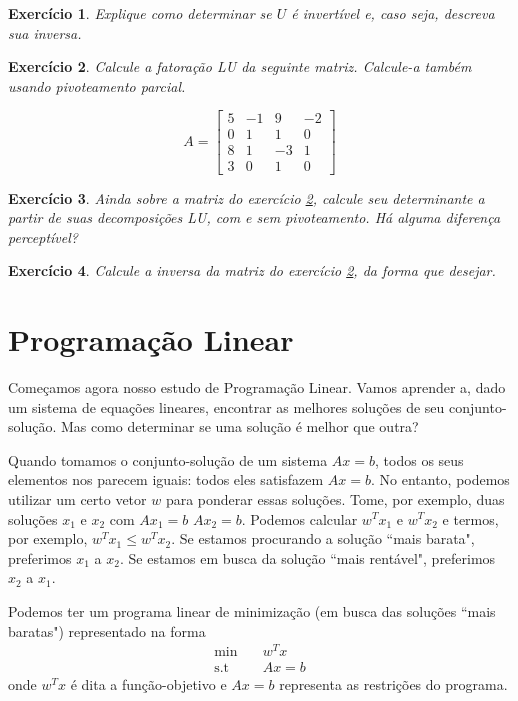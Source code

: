 \documentclass[]{article}
\newtheorem{exercicio}{Exercício}
\numberwithin{equation}{section}
\begin{document}
\begin{exercicio}
	Explique como determinar se $U$ é invertível e, caso seja, descreva sua inversa.
\end{exercicio}

\begin{exercicio} \label{exerciseLU}
  Calcule a fatoração LU da seguinte matriz. Calcule-a também usando pivoteamento parcial.

  \[
  A =
  \left[ {\begin{array}{cccc}
  5 & -1 & 9 & -2 \\
  0 & 1 & 1 & 0 \\
  8 & 1 & -3 & 1 \\
  3 & 0 & 1 & 0
  \end{array} } \right]
  \]
\end{exercicio}

\begin{exercicio}
  Ainda sobre a matriz do exercício \ref{exerciseLU}, calcule seu determinante a partir de suas decomposições LU, com e sem pivoteamento. Há alguma diferença perceptível?
\end{exercicio}

\begin{exercicio}
  Calcule a inversa da matriz do exercício \ref{exerciseLU}, da forma que desejar.
\end{exercicio}

\section{Programação Linear}

Começamos agora nosso estudo de Programação Linear.
Vamos aprender a, dado um sistema de equações lineares, encontrar as melhores soluções de seu conjunto-solução.
Mas como determinar se uma solução é melhor que outra?

Quando tomamos o conjunto-solução de um sistema $Ax = b$, todos os seus elementos nos parecem iguais: todos eles satisfazem $Ax = b$.
No entanto, podemos utilizar um certo vetor $w$ para ponderar essas soluções.
Tome, por exemplo, duas soluções $x_1$ e $x_2$ com $Ax_1 = b$ $Ax_2 = b$.
Podemos calcular $w^Tx_1$ e $w^Tx_2$ e termos, por exemplo, $w^Tx_1 \leq w^Tx_2$.
Se estamos procurando a solução ``mais barata", preferimos $x_1$ a $x_2$.
Se estamos em busca da solução ``mais rentável", preferimos $x_2$ a $x_1$.

Podemos ter um programa linear de minimização (em busca das soluções ``mais baratas") representado na forma
\begin{align}
  \min &\quad w^Tx \\
  \text{s.t} &\quad Ax = b
\end{align}
onde $w^Tx$ é dita a função-objetivo e $Ax = b$ representa as restrições do programa.
\end{document}
